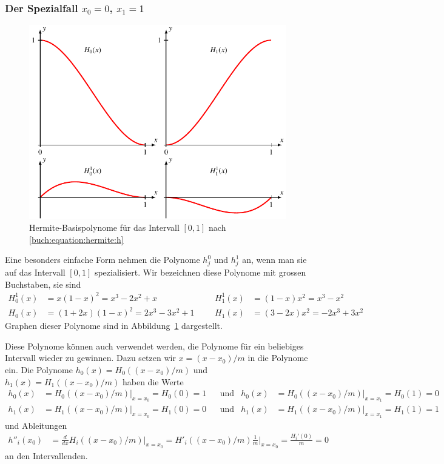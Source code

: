\subsubsection{Der Spezialfall $x_0=0$, $x_1=1$}
\begin{figure}
\centering
\includegraphics{chapters/30-interpolation/figures/h.pdf}
\caption{Hermite-Basispolynome für das Intervall $[0,1]$
nach \eqref{buch:equation:hermite:h}
\label{buch:figure:hermite:h}}
\end{figure}
Eine besonders einfache Form nehmen die Polynome $h_j^0$ und $h_j^1$ an,
wenn man sie auf das Intervall $[0,1]$ spezialisiert.
Wir bezeichnen diese Polynome mit grossen Buchstaben, sie sind
\begin{equation}
\begin{aligned}
H_0^1(x) &= x(1-x)^2=x^3-2x^2+x
&&&
H_1^1(x) &= (1-x)x^2=x^3-x^2
\\
H_0(x)   &= (1+2x)(1-x)^2= 2x^3-3x^2+1
&&&
H_1(x)   &= (3-2x)x^2 = -2x^3+3x^2
\end{aligned}
\label{buch:equation:hermite:h}
\end{equation}
%
%
%
%
Graphen dieser Polynome sind in Abbildung~\ref{buch:figure:hermite:h}
dargestellt.

Diese Polynome können auch verwendet werden, die Polynome für ein
beliebiges Intervall wieder zu gewinnen.
Dazu setzen wir $x=(x-x_0)/m$ in die Polynome ein.
Die Polynome $h_0(x)=H_0((x-x_0)/m)$ und $h_1(x)=H_1((x-x_0)/m)$
haben die Werte
\[
\begin{aligned}
h_0(x)
&=
H_0((x-x_0)/m)\bigg|_{x=x_0}
=
H_0(0)=1
&&\text{und}&
h_0(x)
&=
H_0((x-x_0)/m)\bigg|_{x=x_1}
=
H_0(1)=0
\\
h_1(x)
&=
H_1((x-x_0)/m)\bigg|_{x=x_0}
=
H_1(0)=0
&&\text{und}&
h_1(x)
&=
H_1((x-x_0)/m)\bigg|_{x=x_1}
=
H_1(1)=1
\end{aligned}
\]
und Ableitungen
\begin{align*}
h''_i(x_0)
&=
\frac{d}{dx} H_i((x-x_0)/m)\bigg|_{x=x_0}
=
H'_i((x-x_0)/m) \frac{1}{m}\bigg|_{x=x_0}
=
\frac{H_i'(0)}{m} = 0
\end{align*}
an den Intervallenden.

